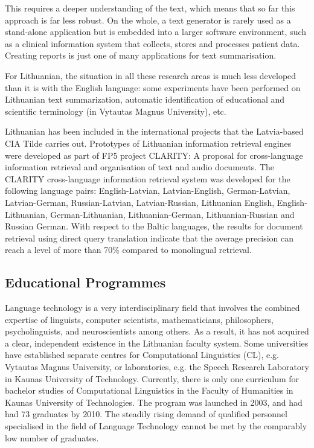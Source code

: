 \begin{multicols}{2}
This requires a deeper understanding of the text, which means that so far this approach is far less robust. On the whole, a text generator is rarely used as a stand-alone application but is embedded into a larger software environment, such as a clinical information system that collects, stores and processes patient data. Creating reports is just one of many applications for text summarisation. 

 For Lithuanian, the situation in all these research areas is much less developed than it is with the English language: some experiments have been performed on Lithuanian text summarization, automatic identification of educational and scientific terminology (in Vytautas Magnus University), etc.

Lithuanian has been included in the international projects that the Latvia-based CIA Tilde carries out. Prototypes of Lithuanian information retrieval engines were developed as part of FP5 project CLARITY: A proposal for cross-language information retrieval and organisation of text and audio documents. The CLARITY cross-language information retrieval system was developed for the following language pairs:  English-Latvian, Latvian-English, German-Latvian, Latvian-German, Russian-Latvian, Latvian-Russian, Lithuanian English, English-Lithuanian, German-Lithuanian, Lithuanian-German, Lithuanian-Russian and Russian German. With respect to the Baltic languages, the results for document retrieval using direct query translation indicate that the average precision can reach a level of more than 70\% compared to monolingual retrieval.

\subsection{Educational Programmes}

 Language technology is a very interdisciplinary field that involves the combined expertise of linguists, computer scientists, mathematicians, philosophers, psycholinguists, and neuroscientists among others. As a result, it has not acquired a clear, independent existence in the Lithuanian faculty system. Some universities have established separate centres for Computational Linguistics (CL), e.g. Vytautas Magnus University, or laboratories, e.g. the Speech Research Laboratory in Kaunas University of Technology. Currently, there is only one curriculum for bachelor studies of Computational Linguistics in the Faculty of Humanities in Kaunas University of Technologies. The program was launched in 2003, and had had 73 graduates by 2010. The steadily rising demand of qualified personnel specialised in the field of Language Technology cannot be met by the comparably low number of graduates.


\end{multicols}
